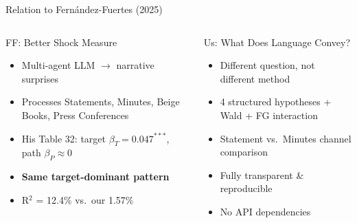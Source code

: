 \documentclass[aspectratio=169, 11pt]{beamer}
\begin{document}
\begin{frame}{Relation to Fernández-Fuertes (2025)}
\begin{columns}[T]
\begin{fblock}[5.5cm]{FF: Better Shock Measure}
\begin{itemize}
  \item Multi-agent LLM $\to$ narrative surprises
  \item Processes Statements, Minutes, Beige Books, Press Conferences
  \item His Table 32: target $\beta_T = 0.047^{***}$, path $\beta_P \approx 0$
  \item \textbf{Same target-dominant pattern}
  \item R$^2$ = 12.4\% vs.\ our 1.57\%
\end{itemize}
\end{fblock}

\begin{falertblock}[5.5cm]{Us: What Does Language Convey?}
\begin{itemize}
  \item Different question, not different method
  \item 4 structured hypotheses + Wald + FG interaction
  \item Statement vs.\ Minutes channel comparison
  \item Fully transparent \& reproducible
  \item No API dependencies
\end{itemize}
\end{falertblock}
\end{columns}

\vspace{0.3em}
\begin{center}
\end{center}
\end{frame}
\end{document}
